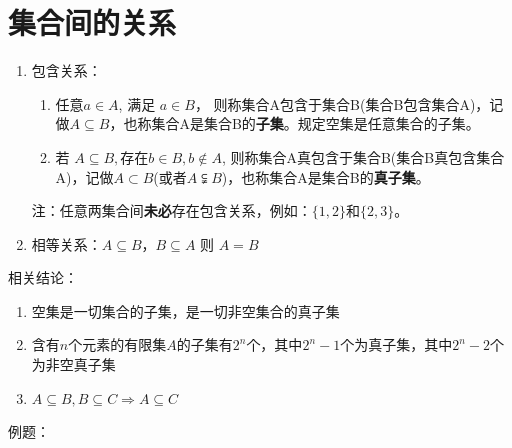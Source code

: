 \section*{集合间的关系}
    \begin{enumerate}
        \item 包含关系：
            \begin{enumerate}
                \item $\mbox{任意} a \in A$, 满足 $a \in B$， 则称集合A包含于集合B(集合B包含集合A)，记做$A \subseteq B$，也称集合A是集合B的\textbf{子集}。规定空集是任意集合的子集。
                \item 若 $A \subseteq B, \mbox{存在}  b \in B, b \notin A$, 则称集合A真包含于集合B(集合B真包含集合A)，记做$A \subset B$(或者$A \subsetneqq B$)，也称集合A是集合B的\textbf{真子集}。
            \end{enumerate}
        注：任意两集合间\textbf{未必}存在包含关系，例如：$\{1,2\}$和$\{2,3\}$。
        \item 相等关系：$A \subseteq B$，$B \subseteq A$ 则 $A = B$
    \end{enumerate}
    相关结论：
    \begin{enumerate}
        \item 空集是一切集合的子集，是一切非空集合的真子集
        \item 含有$n$个元素的有限集$A$的子集有$2^n$个，其中$2^n-1$个为真子集，其中$2^n-2$个为非空真子集
        \item $A \subseteq B, B \subseteq C \Longrightarrow A \subseteq C$
    \end{enumerate}
例题：
